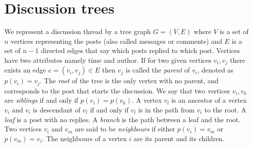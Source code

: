\documentclass[conference]{IEEEtran}
\begin{document}
\section{Discussion trees}
We represent a discussion thread by a tree graph $G=(V,E)$ where $V$ is a set of $n$ vertices representing the posts (also called messages or comments) and $E$ is a set of $n-1$ directed edges that say which posts replied to which post. Vertices have two attributes namely time and author. If for two given vertices $v_i,v_j$ there exists an edge  $e=(v_i, v_j) \in E$ then $v_j$ is called the \textit{parent} of $v_i$, denoted as $p(v_i)=v_j$. The \textit{root} of the tree is the only vertex with no parent, and corresponds to the post that starts the discussion. We say that two vertices $v_i,v_k$ are \textit{siblings} if and only if $p(v_i)=p(v_k)$. A vertex $v_l$ is an ancestor of a vertex $v_i$ and $v_i$ is descendant of $v_l$ if and only if $v_l$ is in the path from $v_i$ to the root. A \textit{leaf} is a post with no replies. A \textit{branch} is the path between a leaf and the root. Two vertices $v_i$ and $v_m$ are said to be \textit{neighbours} if either $p(v_i)=v_m$ or $p(v_m)=v_i$. The neighbours of a vertex $i$ are its parent and its children.



\end{document}
